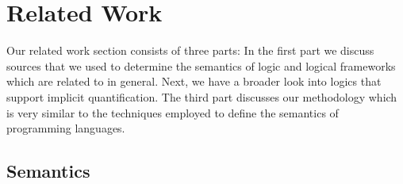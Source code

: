 \section{Related Work}\label{relwork} %
Our related work section consists of three parts: In the first part we discuss sources that we used to determine the semantics of \nthree logic and logical frameworks 
which are related to \nthree in general. 
Next, we have a broader look into logics that support implicit quantification.
The third part discusses
our methodology which is very similar to the techniques employed to define the semantics of programming languages.




\subsection{\nthree Semantics}
